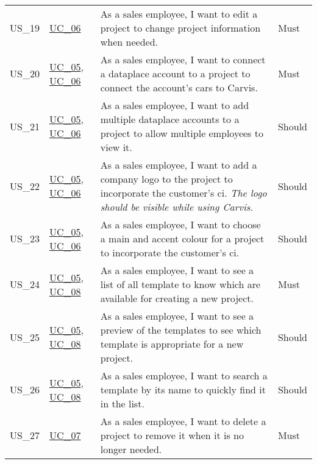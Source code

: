 \begin{footnotesize}
\begin{longtable}[L L L L]{ p{} p{} p{} p{} }
      \hypertarget{Ref:US19}{US\_19} & \hyperlink{Ref:UC6}{UC\_06} & As a sales employee, I want to edit a project to change project information when needed. & Must \\
      \hypertarget{Ref:US20}{US\_20} & \hyperlink{Ref:UC5}{UC\_05}, \newline \hyperlink{Ref:UC6}{UC\_06} & As a sales employee, I want to connect a \gls{dataplace} account to a project to connect the account's cars to Carvis. & Must \\
      \hypertarget{Ref:US21}{US\_21} & \hyperlink{Ref:UC5}{UC\_05}, \newline \hyperlink{Ref:UC6}{UC\_06} & As a sales employee, I want to add multiple \gls{dataplace} accounts to a project to allow multiple employees to view it. & Should \\
      \hypertarget{Ref:US22}{US\_22} & \hyperlink{Ref:UC5}{UC\_05}, \newline \hyperlink{Ref:UC6}{UC\_06} & As a sales employee, I want to add a company logo to the project to incorporate the customer's \gls{ci}. 
      \newline
      \emph{The logo should be visible while using Carvis.} & Should
      \\
      \hypertarget{Ref:US23}{US\_23} & \hyperlink{Ref:UC5}{UC\_05}, \newline \hyperlink{Ref:UC6}{UC\_06} & As a sales employee, I want to choose a main and accent colour for a project to incorporate the customer's \gls{ci}. & Should \\
      \hypertarget{Ref:US24}{US\_24} & \hyperlink{Ref:UC5}{UC\_05}, \newline \hyperlink{Ref:UC8}{UC\_08} & As a sales employee, I want to see a list of all template to know which are available for creating a new project. & Must \\
      \hypertarget{Ref:US25}{US\_25} & \hyperlink{Ref:UC5}{UC\_05}, \newline \hyperlink{Ref:UC8}{UC\_08} & As a sales employee, I want to see a preview of the templates to see which template is appropriate for a new project. & Should \\
      \hypertarget{Ref:US26}{US\_26} & \hyperlink{Ref:UC5}{UC\_05}, \newline \hyperlink{Ref:UC8}{UC\_08} & As a sales employee, I want to search a template by its name to quickly find it in the list. & Should \\
      \hypertarget{Ref:US27}{US\_27} & \hyperlink{Ref:UC7}{UC\_07} & As a sales employee, I want to delete a project to remove it when it is no longer needed. & Must \\

\end{longtable}
\end{footnotesize}

